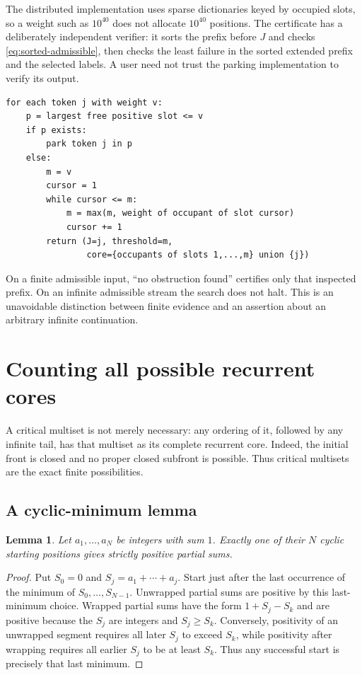\documentclass[11pt,letterpaper]{article}
\newtheorem{lemma}[theorem]{Lemma}
\theoremstyle{definition}
\begin{document}
The distributed implementation uses sparse dictionaries keyed by occupied
slots, so a weight such as $10^{40}$ does not allocate $10^{40}$ positions.
The certificate has a deliberately independent verifier: it sorts the prefix
before $J$ and checks \eqref{eq:sorted-admissible}, then checks the least
failure in the sorted extended prefix and the selected labels. A user need
not trust the parking implementation to verify its output.

\begin{lstlisting}[caption={High-level static classification algorithm.}]
for each token j with weight v:
    p = largest free positive slot <= v
    if p exists:
        park token j in p
    else:
        m = v
        cursor = 1
        while cursor <= m:
            m = max(m, weight of occupant of slot cursor)
            cursor += 1
        return (J=j, threshold=m,
                core={occupants of slots 1,...,m} union {j})
\end{lstlisting}
On a finite admissible input, ``no obstruction found'' certifies only that
inspected prefix. On an infinite admissible stream the search does not halt.
This is an unavoidable distinction between finite evidence and an assertion
about an arbitrary infinite continuation.

\section{Counting all possible recurrent cores}\label{sec:enumeration}
A critical multiset is not merely necessary: any ordering of it, followed
by any infinite tail, has that multiset as its complete recurrent core.
Indeed, the initial front is closed and no proper closed subfront is possible.
Thus critical multisets are the exact finite possibilities.

\subsection{A cyclic-minimum lemma}
\begin{lemma}\label{lem:cycle}
Let $a_1,\ldots,a_N$ be integers with sum $1$. Exactly one of their $N$
cyclic starting positions gives strictly positive partial sums.
\end{lemma}
\begin{proof}
Put $S_0=0$ and $S_j=a_1+\cdots+a_j$. Start just after the last occurrence
of the minimum of $S_0,\ldots,S_{N-1}$. Unwrapped partial sums are positive
by this last-minimum choice. Wrapped partial sums have the form
$1+S_j-S_k$ and are positive because the $S_j$ are integers and
$S_j\ge S_k$. Conversely, positivity of an unwrapped segment requires all
later $S_j$ to exceed $S_k$, while positivity after wrapping requires all
earlier $S_j$ to be at least $S_k$. Thus any successful start is precisely
that last minimum.
\end{proof}
\end{document}

